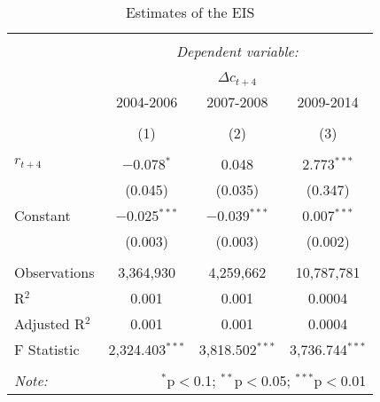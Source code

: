 
\begin{table}[!htbp] \centering 
  \caption{Estimates of the EIS} 
  \label{PooledResultsSeparated} 
\begin{tabular}{@{\extracolsep{5pt}}lccc} 
\\[-1.8ex]\hline 
\hline \\[-1.8ex] 
 & \multicolumn{3}{c}{\textit{Dependent variable:}} \\ 
\cline{2-4} 
\\[-1.8ex] & \multicolumn{3}{c}{$\Delta c_{t+4}$} \\ 
 & 2004-2006 & 2007-2008 & 2009-2014 \\ 
\\[-1.8ex] & (1) & (2) & (3)\\ 
\hline \\[-1.8ex] 
 $r_{t+4}$ & $-$0.078$^{*}$ & 0.048 & 2.773$^{***}$ \\ 
  & (0.045) & (0.035) & (0.347) \\ 
  Constant & $-$0.025$^{***}$ & $-$0.039$^{***}$ & 0.007$^{***}$ \\ 
  & (0.003) & (0.003) & (0.002) \\ 
 \hline \\[-1.8ex] 
Observations & 3,364,930 & 4,259,662 & 10,787,781 \\ 
R$^{2}$ & 0.001 & 0.001 & 0.0004 \\ 
Adjusted R$^{2}$ & 0.001 & 0.001 & 0.0004 \\ 
F Statistic & 2,324.403$^{***}$ & 3,818.502$^{***}$ & 3,736.744$^{***}$ \\ 
\hline 
\hline \\[-1.8ex] 
\textit{Note:}  & \multicolumn{3}{r}{$^{*}$p$<$0.1; $^{**}$p$<$0.05; $^{***}$p$<$0.01} \\ 
\end{tabular} 
\end{table} 
